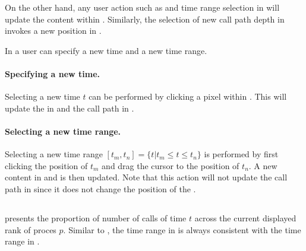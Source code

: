 On the other hand, any user action such as \crosshair{} and time range selection in \depthview{} will update the content within \traceview. Similarly, the selection of new call path depth in \callview{} invokes a new position in \depthview.

In \depthview{} a user can specify a new \crosshair{} time and a new time range.
\paragraph{Specifying a new \crosshair{} time.} Selecting a new \crosshair{} time $t$ can be performed by clicking a pixel within \depthview{}. This will update the \crosshair{} in \traceview{} and the call path in \callview.

\paragraph{Selecting a new time range.} Selecting a new time range $[t_m,t_n]= \{t | t_m\leq t\leq t_n\}$ is performed by first clicking the position of $t_m$ and drag the cursor to the position of $t_n$. A new content in \depthview{} and \traceview{} is then updated. Note that this action will not update the call path in \callview{} since it does not change the position of the \crosshair.


\subsection{\summaryview}
\label{sec:summaryview}

\summaryview{} presents the proportion of number of calls of time $t$ across the current displayed rank of proces $p$. 
Similar to \depthview, the time range in \summaryview{} is always consistent with the time range in \traceview{}.


\subsection{\callview}
\label{sec:callview}

